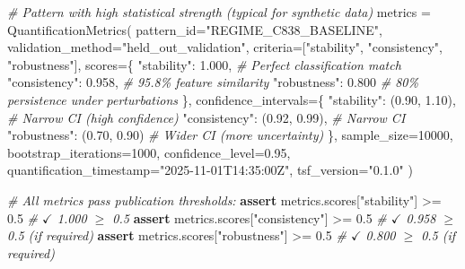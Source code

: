 \documentclass[
]{article}
\newenvironment{Shaded}{}{}
\newcommand{\CommentTok}[1]{\textcolor[rgb]{0.38,0.63,0.69}{\textit{#1}}}
\newcommand{\ControlFlowTok}[1]{\textcolor[rgb]{0.00,0.44,0.13}{\textbf{#1}}}
\newcommand{\DecValTok}[1]{\textcolor[rgb]{0.25,0.63,0.44}{#1}}
\newcommand{\FloatTok}[1]{\textcolor[rgb]{0.25,0.63,0.44}{#1}}
\newcommand{\NormalTok}[1]{#1}
\newcommand{\OperatorTok}[1]{\textcolor[rgb]{0.40,0.40,0.40}{#1}}
\newcommand{\StringTok}[1]{\textcolor[rgb]{0.25,0.44,0.63}{#1}}
\begin{document}
\begin{Shaded}
\begin{Highlighting}[]
\CommentTok{\# Pattern with high statistical strength (typical for synthetic data)}
\NormalTok{metrics }\OperatorTok{=}\NormalTok{ QuantificationMetrics(}
\NormalTok{    pattern\_id}\OperatorTok{=}\StringTok{"REGIME\_C838\_BASELINE"}\NormalTok{,}
\NormalTok{    validation\_method}\OperatorTok{=}\StringTok{"held\_out\_validation"}\NormalTok{,}
\NormalTok{    criteria}\OperatorTok{=}\NormalTok{[}\StringTok{"stability"}\NormalTok{, }\StringTok{"consistency"}\NormalTok{, }\StringTok{"robustness"}\NormalTok{],}
\NormalTok{    scores}\OperatorTok{=}\NormalTok{\{}
        \StringTok{"stability"}\NormalTok{: }\FloatTok{1.000}\NormalTok{,                }\CommentTok{\# Perfect classification match}
        \StringTok{"consistency"}\NormalTok{: }\FloatTok{0.958}\NormalTok{,              }\CommentTok{\# 95.8\% feature similarity}
        \StringTok{"robustness"}\NormalTok{: }\FloatTok{0.800}                \CommentTok{\# 80\% persistence under perturbations}
\NormalTok{    \},}
\NormalTok{    confidence\_intervals}\OperatorTok{=}\NormalTok{\{}
        \StringTok{"stability"}\NormalTok{: (}\FloatTok{0.90}\NormalTok{, }\FloatTok{1.10}\NormalTok{),         }\CommentTok{\# Narrow CI (high confidence)}
        \StringTok{"consistency"}\NormalTok{: (}\FloatTok{0.92}\NormalTok{, }\FloatTok{0.99}\NormalTok{),       }\CommentTok{\# Narrow CI}
        \StringTok{"robustness"}\NormalTok{: (}\FloatTok{0.70}\NormalTok{, }\FloatTok{0.90}\NormalTok{)         }\CommentTok{\# Wider CI (more uncertainty)}
\NormalTok{    \},}
\NormalTok{    sample\_size}\OperatorTok{=}\DecValTok{10000}\NormalTok{,}
\NormalTok{    bootstrap\_iterations}\OperatorTok{=}\DecValTok{1000}\NormalTok{,}
\NormalTok{    confidence\_level}\OperatorTok{=}\FloatTok{0.95}\NormalTok{,}
\NormalTok{    quantification\_timestamp}\OperatorTok{=}\StringTok{"2025{-}11{-}01T14:35:00Z"}\NormalTok{,}
\NormalTok{    tsf\_version}\OperatorTok{=}\StringTok{"0.1.0"}
\NormalTok{)}

\CommentTok{\# All metrics pass publication thresholds:}
\ControlFlowTok{assert}\NormalTok{ metrics.scores[}\StringTok{"stability"}\NormalTok{] }\OperatorTok{\textgreater{}=} \FloatTok{0.5}    \CommentTok{\# $\checkmark$ 1.000 $\geq$ 0.5}
\ControlFlowTok{assert}\NormalTok{ metrics.scores[}\StringTok{"consistency"}\NormalTok{] }\OperatorTok{\textgreater{}=} \FloatTok{0.5}  \CommentTok{\# $\checkmark$ 0.958 $\geq$ 0.5 (if required)}
\ControlFlowTok{assert}\NormalTok{ metrics.scores[}\StringTok{"robustness"}\NormalTok{] }\OperatorTok{\textgreater{}=} \FloatTok{0.5}   \CommentTok{\# $\checkmark$ 0.800 $\geq$ 0.5 (if required)}
\end{Highlighting}
\end{Shaded}
\end{document}
